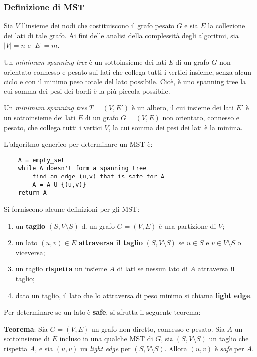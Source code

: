 \subsubsection{Definizione di MST}

Sia $V$ l'insieme dei nodi che costituiscono il grafo pesato $G$ e sia $E$ la collezione dei lati di tale
grafo. Ai fini delle analisi della complessità degli algoritmi, sia $|V| = n$ e $|E| = m$.

Un \textit{minimum spanning tree} è un
sottoinsieme dei lati $E$ di un grafo $G$ non orientato connesso e pesato sui lati che
collega tutti i vertici insieme, senza alcun ciclo e con il minimo peso totale del
lato possibile. Cioè, è uno spanning tree la cui somma dei pesi dei bordi è la più
piccola possibile.

Un \textit{minimum spanning tree} $T = (V, E')$ è un albero, il cui insieme dei lati $E'$ è un
sottoinsieme dei lati $E$ di un grafo $G = (V, E)$ non orientato, connesso e
pesato, che collega tutti i vertici $V$, la cui somma dei pesi dei lati è la minima.

L'algoritmo generico per determinare un MST è:
\begin{verbatim}
    A = empty_set
    while A doesn't form a spanning tree
        find an edge (u,v) that is safe for A
        A = A U {(u,v)}
    return A
\end{verbatim}

Si forniscono alcune definizioni per gli MST:
\begin{enumerate}
    \item un \textbf{taglio} $(S, V \setminus S)$ di un grafo $G = (V, E)$ è una partizione
    di $V$;
    \item un lato $(u, v) \in E$ \textbf{attraversa il taglio} $(S, V \setminus S)$ se
    $u \in S$ e $v \in V \setminus S$ o viceversa;
    \item un taglio \textbf{rispetta} un insieme $A$ di lati se nessun lato di $A$ attraversa
    il taglio;
    \item dato un taglio, il lato che lo attraversa di peso minimo si chiama \textbf{light edge}.
\end{enumerate}

Per determinare se un lato è \textbf{safe}, si sfrutta il seguente teorema:

\textbf{Teorema}: Sia $G = (V, E)$ un grafo non diretto, connesso e pesato. Sia $A$ un
sottoinsieme di $E$ incluso in una qualche MST di $G$, sia $(S, V \setminus S)$ un
taglio che rispetta $A$, e sia $(u, v)$ un \textit{light edge} per $(S, V \setminus S)$.
Allora $(u, v)$ è \textit{safe} per $A$.

